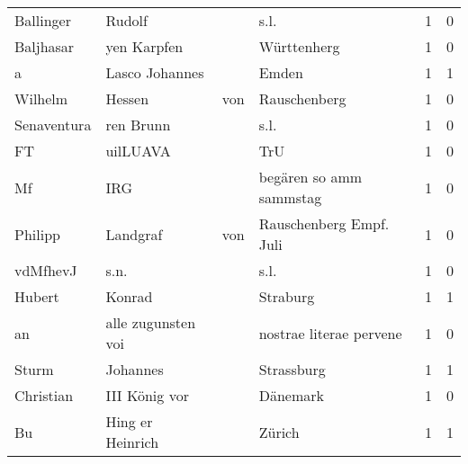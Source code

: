 \begin{tabular}{llllrr}
                Ballinger &                             Rudolf &             &                                        s.l. &          1 &         0 \\
                Baljhasar &                        yen Karpfen &             &                                 Württenherg &          1 &         0 \\
                        a &                     Lasco Johannes &             &                                       Emden &          1 &         1 \\
                  Wilhelm &                             Hessen &         von &                                Rauschenberg &          1 &         0 \\
              Senaventura &                          ren Brunn &             &                                        s.l. &          1 &         0 \\
                       FT &                           uilLUAVA &             &                                         TrU &          1 &         0 \\
                       Mf &                                IRG &             &                     begären so amm sammstag &          1 &         0 \\
                  Philipp &                           Landgraf &         von &                     Rauschenberg Empf. Juli &          1 &         0 \\
                 vdMfhevJ &                               s.n. &             &                                        s.l. &          1 &         0 \\
                   Hubert &                             Konrad &             &                                    Straburg &          1 &         1 \\
                       an &                 alle zugunsten voi &             &                     nostrae literae pervene &          1 &         0 \\
                    Sturm &                           Johannes &             &                                  Strassburg &          1 &         1 \\
                Christian &                      III König vor &             &                                    Dänemark &          1 &         0 \\
                       Bu &                   Hing er Heinrich &             &                                      Zürich &          1 &         1 \\

\end{tabular}
